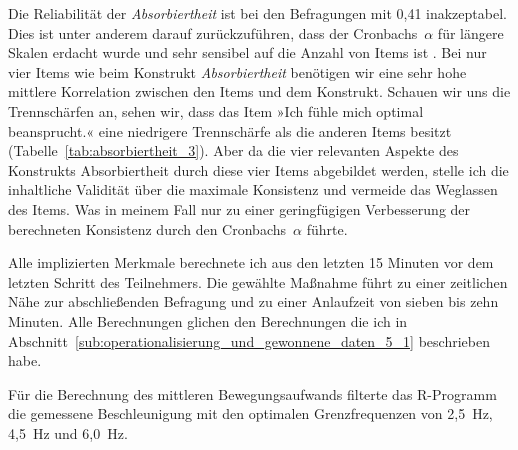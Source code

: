 Die Reliabilität der \emph{Absorbiertheit} ist bei den Befragungen mit 0,41 inakzeptabel. Dies ist unter anderem darauf zurückzuführen, dass der Cronbachs~$\alpha$ für längere Skalen erdacht wurde und sehr sensibel auf die Anzahl von Items ist \citep{Cortina1993}. Bei nur vier Items wie beim Konstrukt \emph{Absorbiertheit} benötigen wir eine sehr hohe mittlere Korrelation zwischen den Items und dem Konstrukt. Schauen wir uns die Trennschärfen an, sehen wir, dass das Item »Ich fühle mich optimal beansprucht.« eine niedrigere Trennschärfe als die anderen Items besitzt (Tabelle~\ref{tab:absorbiertheit_3}). Aber da die vier relevanten Aspekte des Konstrukts Absorbiertheit durch diese vier Items abgebildet werden, stelle ich die inhaltliche Validität über die maximale Konsistenz und vermeide das Weglassen des Items. Was in meinem Fall nur zu einer geringfügigen Verbesserung der berechneten Konsistenz durch den Cronbachs~$\alpha$ führte. 

Alle implizierten Merkmale berechnete ich aus den letzten 15 Minuten vor dem letzten Schritt des Teilnehmers. Die gewählte Maßnahme führt zu einer zeitlichen Nähe zur abschließenden Befragung und zu einer Anlaufzeit von sieben bis zehn Minuten. Alle Berechnungen glichen den Berechnungen die ich in Abschnitt~\ref{sub:operationalisierung_und_gewonnene_daten_5_1} beschrieben habe.

Für die Berechnung des mittleren Bewegungsaufwands filterte das R-Programm die gemessene Beschleunigung mit den optimalen Grenzfrequenzen von 2,5~Hz, 4,5~Hz und 6,0~Hz. 

